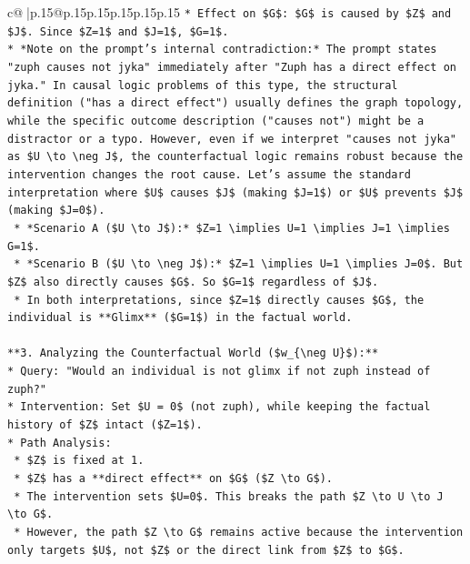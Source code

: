 \documentclass{article}
\begin{document}
{\begin{supertabular}{c@{$\;$}|p{.15\linewidth}@{}p{.15\linewidth}p{.15\linewidth}p{.15\linewidth}p{.15\linewidth}p{.15\linewidth}}
{{{\texttt{*   Effect on \$G\$: \$G\$ is caused by \$Z\$ and \$J\$. Since \$Z=1\$ and \$J=1\$, \$G=1\$.} \\
\texttt{*   *Note on the prompt's internal contradiction:* The prompt states "zuph causes not jyka" immediately after "Zuph has a direct effect on jyka." In causal logic problems of this type, the structural definition ("has a direct effect") usually defines the graph topology, while the specific outcome description ("causes not") might be a distractor or a typo. However, even if we interpret "causes not jyka" as \$U \textbackslash{}to \textbackslash{}neg J\$, the counterfactual logic remains robust because the intervention changes the root cause. Let's assume the standard interpretation where \$U\$ causes \$J\$ (making \$J=1\$) or \$U\$ prevents \$J\$ (making \$J=0\$).} \\
\texttt{    *   *Scenario A (\$U \textbackslash{}to J\$):* \$Z=1 \textbackslash{}implies U=1 \textbackslash{}implies J=1 \textbackslash{}implies G=1\$.} \\
\texttt{    *   *Scenario B (\$U \textbackslash{}to \textbackslash{}neg J\$):* \$Z=1 \textbackslash{}implies U=1 \textbackslash{}implies J=0\$. But \$Z\$ also directly causes \$G\$. So \$G=1\$ regardless of \$J\$.} \\
\texttt{    *   In both interpretations, since \$Z=1\$ directly causes \$G\$, the individual is **Glimx** (\$G=1\$) in the factual world.} \\
\\ 
\texttt{**3. Analyzing the Counterfactual World (\$w\_\{\textbackslash{}neg U\}\$):**} \\
\texttt{*   Query: "Would an individual is not glimx if not zuph instead of zuph?"} \\
\texttt{*   Intervention: Set \$U = 0\$ (not zuph), while keeping the factual history of \$Z\$ intact (\$Z=1\$).} \\
\texttt{*   Path Analysis:} \\
\texttt{    *   \$Z\$ is fixed at 1.} \\
\texttt{    *   \$Z\$ has a **direct effect** on \$G\$ (\$Z \textbackslash{}to G\$).} \\
\texttt{    *   The intervention sets \$U=0\$. This breaks the path \$Z \textbackslash{}to U \textbackslash{}to J \textbackslash{}to G\$.} \\
\texttt{    *   However, the path \$Z \textbackslash{}to G\$ remains active because the intervention only targets \$U\$, not \$Z\$ or the direct link from \$Z\$ to \$G\$.} \\
}}}
\end{supertabular}}
\end{document}
